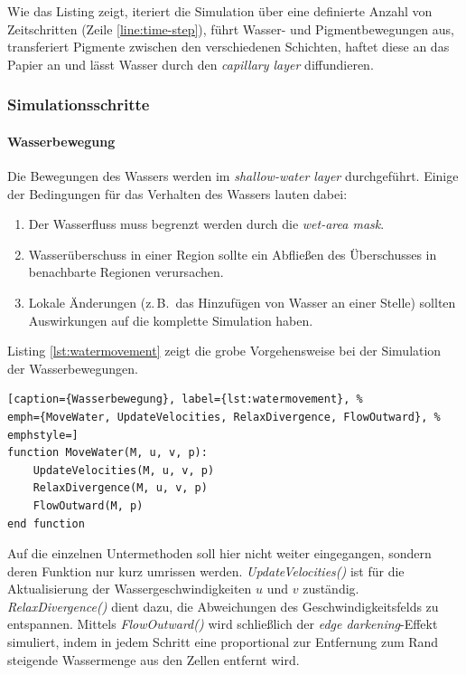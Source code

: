 Wie das Listing zeigt, iteriert die Simulation über eine definierte Anzahl von 
Zeitschritten (Zeile \ref{line:time-step}), führt Wasser- und Pigmentbewegungen 
aus, transferiert Pigmente zwischen den verschiedenen Schichten, haftet diese 
an das Papier an und lässt Wasser durch den \textsl{capillary layer} 
diffundieren.

\subsubsection{Simulationsschritte}
\paragraph{Wasserbewegung} 
Die Bewegungen des Wassers werden im \textsl{shallow-water layer} durchgeführt. 
Einige der Bedingungen für das Verhalten des Wassers lauten dabei:

\begin{enumerate}
  \item Der Wasserfluss muss begrenzt werden durch die \textsl{wet-area mask}.
  \item Wasserüberschuss in einer Region sollte ein Abfließen des Überschusses in
  benachbarte Regionen verursachen.
  \item Lokale Änderungen (z.\,B.\ das Hinzufügen von Wasser an einer Stelle) 
  sollten Auswirkungen auf die komplette Simulation haben.
\end{enumerate}

Listing \ref{lst:watermovement} zeigt die grobe Vorgehensweise bei der 
Simulation der Wasserbewegungen.

\begin{lstlisting}[caption={Wasserbewegung}, label={lst:watermovement}, %
emph={MoveWater, UpdateVelocities, RelaxDivergence, FlowOutward}, %
emphstyle=]
function MoveWater(M, u, v, p):
	UpdateVelocities(M, u, v, p)
	RelaxDivergence(M, u, v, p)
	FlowOutward(M, p)
end function
\end{lstlisting}

Auf die einzelnen Untermethoden soll hier nicht weiter eingegangen, sondern 
deren Funktion nur kurz umrissen werden. \textsl{UpdateVelocities()} ist für
die Aktualisierung der Wassergeschwindigkeiten $u$ und $v$ zuständig.
\textsl{RelaxDivergence()} dient dazu, die Abweichungen des
Geschwindigkeitsfelds zu entspannen. Mittels \textsl{FlowOutward()} wird
schließlich der \textsl{edge darkening}-Effekt simuliert, indem in jedem 
Schritt eine proportional zur Entfernung zum Rand steigende Wassermenge aus den 
Zellen entfernt wird.

